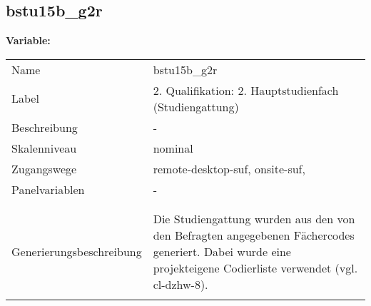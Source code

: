 	
	
	\subsection{bstu15b\_g2r}
	\label{subSection:bstu15b_g2r}

	\noindent\textbf{Variable:}\\
		\begin{tabular}{lL{11.3cm}}
			\label{tableVariable:bstu15b_g2r}
			Name & bstu15b\_g2r \\
			Label & 2. Qualifikation: 2. Hauptstudienfach (Studiengattung) \\
			Beschreibung & - \\
			Skalenniveau & nominal \\
			Zugangswege &
				remote-desktop-suf,
				onsite-suf,
 \\
			Panelvariablen & -
			 \\
			 \\
 \\
					Generierungsbeschreibung & Die Studiengattung wurden aus den von den Befragten angegebenen Fächercodes generiert.  Dabei wurde eine projekteigene Codierliste verwendet (vgl. cl-dzhw-8).
				 \\	
			 \\
		\end{tabular}






